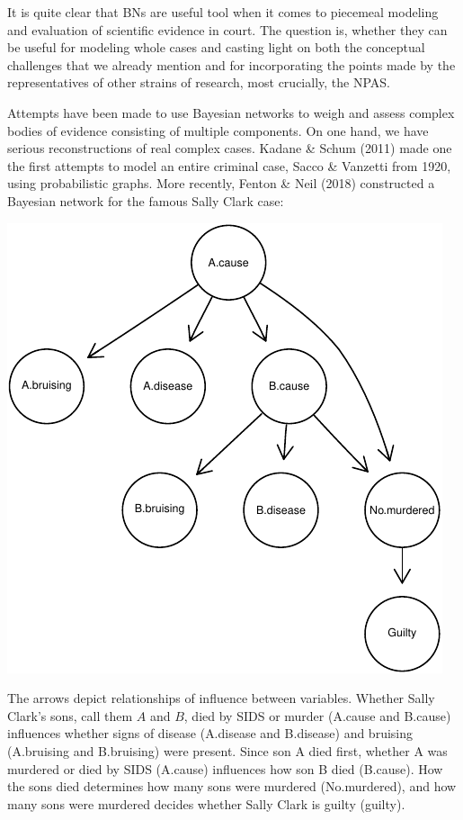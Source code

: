 \documentclass[11pt,dvipsnames,enabledeprecatedfontcommands]{scrartcl}
\begin{document}
It is quite clear that BNs are useful tool when it comes to piecemeal
modeling and evaluation of scientific evidence in court. The question
is, whether they can be useful for modeling whole cases and casting
light on both the conceptual challenges that we already mention and for
incorporating the points made by the representatives of other strains of
research, most crucially, the NPAS.

Attempts have been made to use Bayesian networks to weigh and assess
complex bodies of evidence consisting of multiple components. On one
hand, we have serious reconstructions of real complex cases. Kadane \&
Schum (2011) made one the first attempts to model an entire criminal
case, Sacco \& Vanzetti from 1920, using probabilistic graphs. More
recently, Fenton \& Neil (2018) constructed a Bayesian network for the
famous Sally Clark case:

\begin{center}\includegraphics{BNfiles/unnamed-chunk-11-1} \end{center}

\noindent The arrows depict relationships of influence between
variables. Whether Sally Clark's sons, call them \(A\) and \(B\), died
by SIDS or murder (\textsf{A.cause} and \textsf{B.cause}) influences
whether signs of disease (\textsf{A.disease} and \textsf{B.disease}) and
bruising (\textsf{A.bruising} and \textsf{B.bruising}) were present.
Since son A died first, whether A was murdered or died by SIDS
(\textsf{A.cause}) influences how son B died (\textsf{B.cause}). How the
sons died determines how many sons were murdered (\textsf{No.murdered}),
and how many sons were murdered decides whether Sally Clark is guilty
(\textsf{guilty}).
\end{document}
